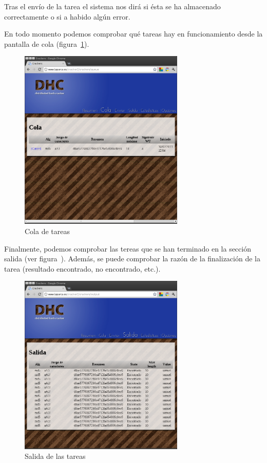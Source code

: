 Tras el envío de la tarea el sistema nos dirá si ésta se ha almacenado correctamente o si a habido algún error.

En todo momento podemos comprobar qué tareas hay en funcionamiento desde la pantalla de cola (figura~\ref{fig:DHC_cola}).

\begin{figure}
	\centering
	\includegraphics[width=0.7\textwidth]{images/cola.png}
	\caption{Cola de tareas}\label{fig:DHC_cola}
\end{figure}

Finalmente, podemos comprobar las tereas que se han terminado en la sección salida (ver figura~). Además, se puede comprobar la razón de la finalización de la tarea (resultado encontrado, no encontrado, etc.).

\begin{figure}
	\centering
	\includegraphics[width=0.7\textwidth]{images/salida.png}
	\caption{Salida de las tareas}\label{fig:DHC_saliad}
\end{figure}


